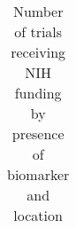 \begin{table}[htbp]\centering
\caption{Number of trials receiving NIH funding by presence of biomarker and location}
\begin{tabular}{l*{4}{c}}
\hline\hline


\hline\hline
\end{tabular}
\end{table}
